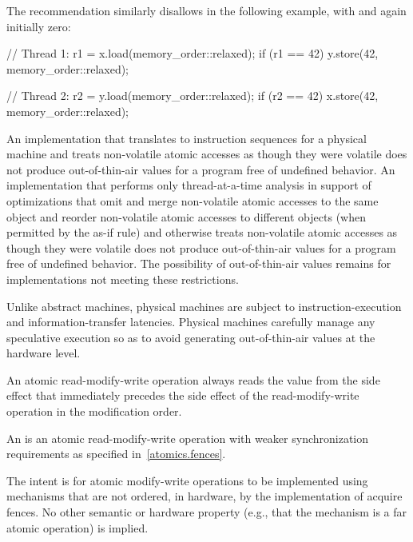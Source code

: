 \pnum
\begin{note}
The recommendation similarly disallows  in the
following example, with  and  again initially zero:

\begin{codeblock}
// Thread 1:
r1 = x.load(memory_order::relaxed);
if (r1 == 42) y.store(42, memory_order::relaxed);
\end{codeblock}

\begin{codeblock}
// Thread 2:
r2 = y.load(memory_order::relaxed);
if (r2 == 42) x.store(42, memory_order::relaxed);
\end{codeblock}
\end{note}

\begin{note}
An implementation that
translates to instruction sequences for a physical machine and
treats non-volatile atomic accesses as though they were volatile
does not produce out-of-thin-air values for a program free of undefined behavior.
An implementation that
performs only thread-at-a-time analysis in support of optimizations
that omit and merge non-volatile atomic accesses to the same object and
reorder non-volatile atomic accesses to different objects (when permitted by the as-if rule) and
otherwise treats non-volatile atomic accesses as though they were volatile
does not produce out-of-thin-air values for a program free of undefined behavior.
The possibility of out-of-thin-air values remains
for implementations not meeting these restrictions.
\end{note}

\pnum
\begin{note}
Unlike abstract machines,
physical machines are subject to instruction-execution and information-transfer latencies.
Physical machines carefully manage any speculative execution
so as to avoid generating out-of-thin-air values at the hardware level.
\end{note}

\pnum
An atomic read-modify-write operation always reads the value
from the side effect that immediately precedes the side effect of the
read-modify-write operation in the modification order.

\pnum
An  is
an atomic read-modify-write operation
with weaker synchronization requirements as specified in~\ref{atomics.fences}.
\begin{note}
The intent is for atomic modify-write operations
to be implemented using mechanisms that are not ordered, in hardware,
by the implementation of acquire fences.
No other semantic or hardware property
(e.g., that the mechanism is a far atomic operation) is implied.
\end{note}

